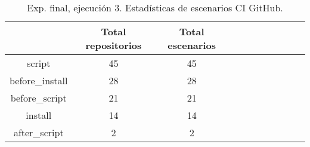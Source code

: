 \begin{table}
  \centering
  \caption{Exp. final, ejecución 3. Estadísticas de escenarios CI GitHub.}
  \label{tab:tabla_f3_5}

\begin{footnotesize}
\renewcommand{\arraystretch}{1.5} %
\begin{tabular}{ccccccccccc}
  \hline
  {} &  Total repositorios &  Total escenarios \\
  \hline
  script         &                  45 &            45 \\
  before\_install &                  28 &            28 \\
  before\_script  &                  21 &            21 \\
  install        &                  14 &            14 \\
  after\_script   &                   2 &             2 \\
 \end{tabular}
\end{footnotesize}

\end{table}